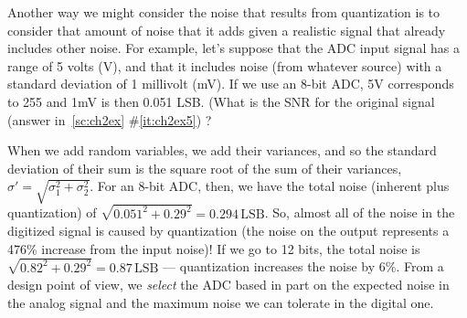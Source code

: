 Another way we might consider the noise that results from quantization
is to consider that amount of noise that it adds given a realistic
signal that already includes other noise. For example, let's suppose
that the ADC input signal has a range of 5 volts (V), and that it
includes noise (from whatever source) with a standard deviation of 1
millivolt (mV). If we use an 8-bit ADC, 5V corresponds to 255 and 1mV
is then 0.051 LSB. (What is the SNR for the original signal (answer
in~\ref{sc:ch2ex} \#\ref{it:ch2ex5}) ?

When we add
random variables, we add their variances, and so the standard
deviation of their sum is the square root of the sum of their
variances, $\sigma' = \sqrt{\sigma_1^2 + \sigma_2^2}$. For an 8-bit
ADC, then, we have the total noise (inherent plus quantization) of
$\sqrt{0.051^2 + 0.29^2} = 0.294 \, \textrm{LSB}$. So, almost all of
the noise in the digitized signal is caused by quantization (the noise
on the output represents a 476\% increase from the input noise)! If we
go to 12 bits, the total noise is $\sqrt{0.82^2 + 0.29^2} = 0.87 \,
\textrm{LSB}$ --- quantization increases the noise by 6\%. From a
design point of view, we \emph{select} the ADC based in part on the
expected noise in the analog signal and the maximum noise we can
tolerate in the digital one.  



